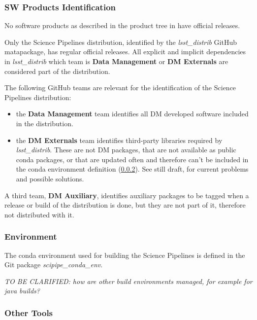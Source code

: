 \subsubsection{SW Products Identification} \label{sec:statusIdentification}

No software products as described in the product tree in  have official releases. 

Only the Science Pipelines distribution, identified by the \textit{lsst\_distrib} GitHub matapackage, has regular official releases.
All explicit and implicit dependencies in \textit{lsst\_distrib} which team is \textbf{Data Management} or \textbf{DM Externals} are considered part of the distribution.

The following GitHub teams are relevant for the identification of the Science Pipelines distribution:

\begin{itemize}
\item the \textbf{Data Management} team identifies all DM developed software included in the distribution.
\item the \textbf{DM Externals} team identifies third-party libraries required by \textit{lsst\_distrib}.
These are not DM packages, that are not available as public conda packages, or that are updated often and therefore can't be included in the conda environment definition (\ref{sec:statusEnvs}).
See  still draft, for current problems and possible solutions.
\end{itemize}

A third team, \textbf{DM Auxiliary}, identifies auxiliary packages to be tagged when a release or build of the distribution is done, but they are not part of it, therefore not distributed with it.


\subsubsection{Environment} \label{sec:statusEnvs}

The conda environment used for building the Science Pipelines is defined in the Git package \textit{scipipe\_conda\_env}.

\textit{TO BE CLARIFIED: how are other build environments managed, for example for java builds?}


\subsubsection{Other Tools} \label{sec:statusTools}

